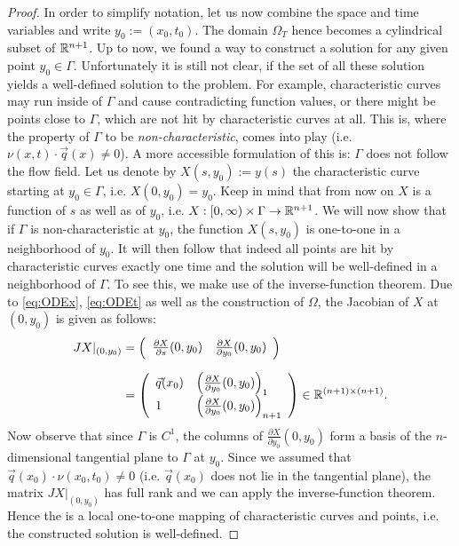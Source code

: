\documentclass[paper=a4, fontsize=12pt,parskip=half,draft,headings=small]{scrartcl}
\newcommand{\q}{\vec{q}}
\begin{document}
\begin{proof}
			In order to simplify notation, let us now combine the space and time variables and write $y_0:=(x_0,t_0)$.
			The domain $\Omega_T$ hence becomes a cylindrical subset of $\mathbb{R}^{n+1}$.
			Up to now, we found a way to construct a solution for any given point $y_0 \in \Gamma$.
			Unfortunately it is still not clear, if the set of all these solution yields a well-defined solution to the problem. 
			For example, characteristic curves may run inside of $\Gamma$ and cause contradicting function values, or there might be points close to $\Gamma$, which are not hit by characteristic curves at all.
			This is, where the property of $\Gamma$ to be \emph{non-characteristic}, comes into play (i.e. $\nu(x,t) \cdot \q(x) \neq 0$).
			A more accessible formulation of this is: $\Gamma$ does not follow the flow field.
			Let us denote by $X(s,y_0):=y(s)$ the characteristic curve starting at $y_0 \in \Gamma$, i.e. $X(0,y_0) = y_0$. 
			Keep in mind that from now on $X$ is a function of $s$ as well as of $y_0$, i.e. $X:[0,\infty)\times\Gamma \to \mathbb{R}^{n+1}$.
			We will now show that if $\Gamma$ is non-characteristic at $y_0$, the function $X(s,y_0)$ is one-to-one in a neighborhood of $y_0$. 
			It will then follow that indeed all points are hit by characteristic curves exactly one time and the solution will be well-defined in a neighborhood of $\Gamma$.
			To see this, we make use of the inverse-function theorem.
			Due to \eqref{eq:ODEx}, \eqref{eq:ODEt} as well as the construction of $\Omega$, the Jacobian of $X$ at $(0,y_0)$ is given as follows:
			\begin{align*}
				JX\vert_{(0,y_0)} 
				&= \left( 
				   \begin{array}{l l}
				   		\tfrac{\partial X}{\partial s}(0,y_0) &  \tfrac{\partial X}{\partial y_0}(0,y_0)
				   \end{array}
				   \right) \\[2\jot]
				&= \left(
				\begin{array}{l l}
						\q(x_0) & \left(\tfrac{\partial X}{\partial y_0}(0,y_0)\right)_1 \\
						      1      & \left(\tfrac{\partial X}{\partial y_0}(0,y_0)\right)_{n+1}
				  \end{array}
				  \right)
				  \in \R^{(n+1) \times (n+1)}.
			\end{align*}
			Now observe that since $\Gamma$ is $C^1$, the columns of $\frac{\partial X}{\partial y_0}(0,y_0)$ form a basis of the $n$-dimensional tangential plane to $\Gamma$ at $y_0$.
			Since we assumed that $\q(x_0) \cdot \nu(x_0,t_0) \neq 0$ (i.e. $\q(x_0)$ does not lie in the tangential plane), the matrix $JX\vert_{(0,y_0)}$ has full rank and we can apply the inverse-function theorem.
			Hence the is a local one-to-one mapping of characteristic curves and points, i.e. the constructed solution is well-defined.
		\end{proof}
		
\end{document}
